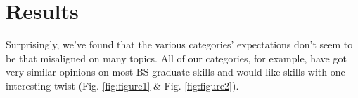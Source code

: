 \documentclass{sigchi}
\begin{document}
%
%

\section{Results}
Surprisingly, we've found that the various categories' expectations don't seem to be that misaligned on many topics. All of our categories, for example, have got very similar opinions on most BS graduate skills and would-like skills with one interesting twist (Fig. \ref{fig:figure1} \& Fig. \ref{fig:figure2}).
\end{document}

